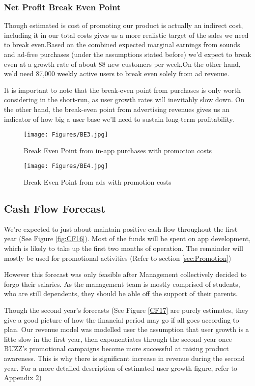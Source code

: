 \documentclass[12pt]{article}
\begin{document}
\subsubsection*{Net Profit Break Even Point}
Though estimated is cost of promoting our product is actually an indirect cost, including it in our total costs gives us a more realistic target of the sales we need to break even.Based on the combined expected marginal earnings from sounds and ad-free purchases (under the assumptions stated before) we'd expect to break even at a growth rate of about 88 new customers per week.On the other hand, we'd need 87,000 weekly active users to break even solely from ad revenue.

It is important to note that the break-even point from purchases is only worth considering in the short-run, as user growth rates will inevitably slow down. On the other hand, the break-even point from advertising revenues gives us an indicator of how big a user base we’ll need to sustain long-term profitability.

\begin{figure}[p]
    \centering
    \texttt{[image: Figures/BE3.jpg]}
    \caption{Break Even Point from in-app purchases with promotion costs}
    \label{fig:BE_NP_Purchases}
\end{figure}

\begin{figure}[p]
    \centering
    \texttt{[image: Figures/BE4.jpg]}
    \caption{Break Even Point from ads with promotion costs}
    \label{fig:BE_NP_Ads}
\end{figure}

\subsection{Cash Flow Forecast}
We're expected to just about maintain positive cash flow throughout the first year (See Figure \ref{fig:CF16}). Most of the funds will be spent on app development, which is likely to take up the first two months of operation. The remainder will mostly be used for promotional activities (Refer to section \ref{sec:Promotion})

However this forecast was only feasible after Management collectively decided to forgo their salaries. As the management team is mostly comprised of students, who are still dependents, they should be able off the support of their parents.

Though the second year's forecasts (See Figure \ref{CF17} are purely estimates, they give a good picture of how the financial period may go if all goes according to plan. Our revenue model was modelled user the assumption that user growth is a litte slow in the first year, then exponentiates through the second year once BUZZ's promotional campaigns become more successful at raising product awareness. This is why there is significant increase in revenue during the second year. For a more detailed description of estimated user growth figure, refer to Appendix 2)
\end{document}

